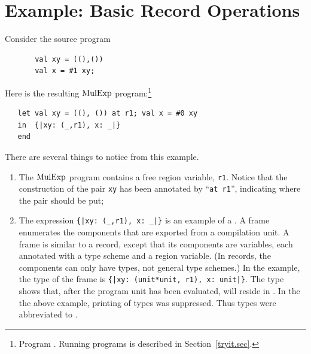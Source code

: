 \documentclass[12pt]{book}
\begin{document}
\section{Example: Basic Record Operations}
\label{proj.ex}
Consider the source program
\begin{verbatim}
       val xy = ((),()) 
       val x = #1 xy;
\end{verbatim}
Here is the resulting $\hbox{\rm MulExp}$ program:\footnote{Program
  . Running programs is described in
  Section~\ref{tryit.sec}.}
\begin{verbatim}
   let val xy = ((), ()) at r1; val x = #0 xy
   in  {|xy: (_,r1), x: _|}
   end 
\end{verbatim}
There are several things to notice from this example. 
\begin{enumerate}
\item The $\hbox{\rm MulExp}$ program contains a free region variable,
      {\tt r1}. Notice that the construction of the
      pair {\tt xy} has been annotated by ``{\tt at r1}'', indicating
      where the pair should be put;
\item The expression \verb+{|xy: (_,r1), x: _|}+ is
      an example of a . A frame enumerates
      the components that are exported from a compilation unit.
      A frame is similar to a record, except that its components
      are variables, each annotated with a type scheme and
      a region variable. (In records, the components can only
      have types, not general type schemes.) In the example,
      the type of the frame is \verb+{|xy: (unit*unit, r1), x: unit|}+. 
      The type shows that, after the program unit has been
      evaluated,   will reside in .
      In the the above example, printing of types was suppressed. Thus
      types were abbreviated to \boxml{\_}.
\end{enumerate}
\end{document}
